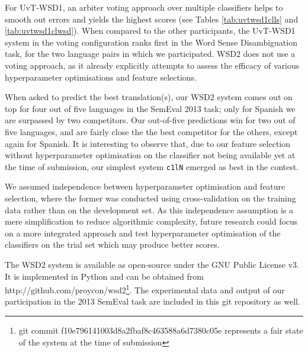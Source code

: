 For UvT-WSD1, an arbiter voting approach over multiple classifiers helps to smooth out errors
and yields the highest scores (see Tables \ref{tab:uvtwsd1clls} and
\ref{tab:uvtwsd1clwsd}). When compared to the other
participants, the UvT-WSD1 system in the voting configuration ranks first in
the Word Sense Disambiguation task, for the two language pairs in which we
participated. WSD2 does not use a voting approach, as it already explicitly
attempts to assess the efficacy of various hyperparameter optimisations and
feature selections. 

When asked to predict the best translation(s), our WSD2 system comes out on top
for four out of five languages in the SemEval 2013 task; only for Spanish we
are surpassed by two competitors. Our out-of-five predictions win for two out
of five languages, and are fairly close the the best competitor for the others,
except again for Spanish. It is interesting to observe that, due to our feature
selection without hyperparameter optimisation on the classifier not being
available yet at the time of submission, our simplest system \texttt{c1lN}
emerged as best in the contest.

We assumed independence between hyperparameter optimisation and feature
selection, where the former was conducted using cross-validation on the
training data rather than on the development set. As this independence
assumption is a mere simplification to reduce algorithmic complexity, future
research could focus on a more integrated approach and test hyperparameter
optimisation of the classifiers on the trial set which may produce better
scores.

The WSD2 system is available as open-source under the GNU Public License v3. It
is implemented in Python \citep{PYTHON} and can be obtained from
http://github.com/proycon/wsd2\footnote{git commit
f10e796141003d8a2fbaf8c463588a6d7380c05e represents a fair state of the system
at the time of submission}. The experimental data and output of our
participation in the 2013 SemEval task are included in
this git repository as well.  

